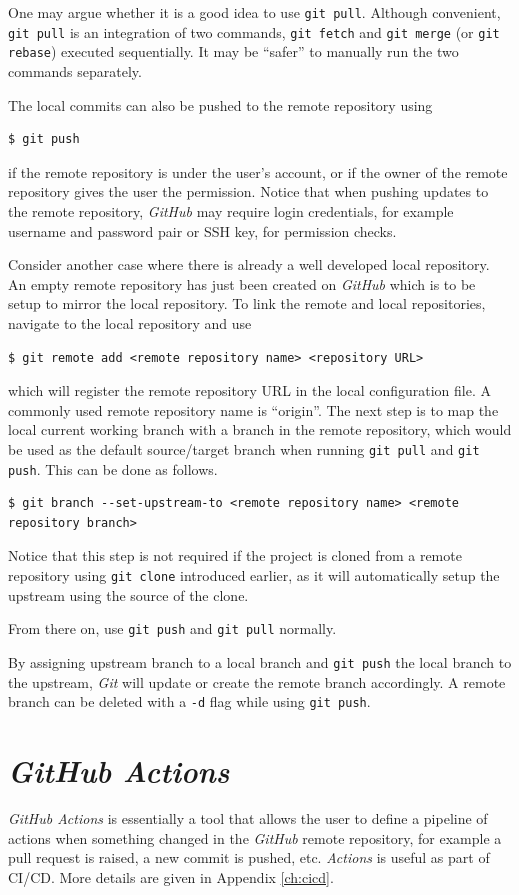 \begin{shortbox}

One may argue whether it is a good idea to use \verb|git pull|. Although convenient, \verb|git pull| is an integration of two commands, \verb|git fetch| and \verb|git merge| (or \verb|git rebase|) executed sequentially. It may be ``safer'' to manually run the two commands separately.
\end{shortbox}

The local commits can also be pushed to the remote repository using
\begin{lstlisting}
$ git push
\end{lstlisting}
if the remote repository is under the user's account, or if the owner of the remote repository gives the user the permission. Notice that when pushing updates to the remote repository, \textit{GitHub} may require login credentials, for example username and password pair or SSH key, for permission checks.

Consider another case where there is already a well developed local repository. An empty remote repository has just been created on \textit{GitHub} which is to be setup to mirror the local repository. To link the remote and local repositories, navigate to the local repository and use
\begin{lstlisting}
$ git remote add <remote repository name> <repository URL>
\end{lstlisting}
which will register the remote repository URL in the local configuration file. A commonly used remote repository name is ``origin''. The next step is to map the local current working branch with a branch in the remote repository, which would be used as the default source/target branch when running \verb|git pull| and \verb|git push|. This can be done as follows.
\begin{lstlisting}
$ git branch --set-upstream-to <remote repository name> <remote repository branch>
\end{lstlisting}
Notice that this step is not required if the project is cloned from a remote repository using \verb|git clone| introduced earlier, as it will automatically setup the upstream using the source of the clone.

From there on, use \verb|git push| and \verb|git pull| normally.

By assigning upstream branch to a local branch and \verb|git push| the local branch to the upstream, \textit{Git} will update or create the remote branch accordingly. A remote branch can be deleted with a \verb|-d| flag while using \verb|git push|.

\section{\textit{GitHub Actions}}

\textit{GitHub Actions} is essentially a tool that allows the user to define a pipeline of actions when something changed in the \textit{GitHub} remote repository, for example a pull request is raised, a new commit is pushed, etc. \textit{Actions} is useful as part of CI/CD. More details are given in Appendix \ref{ch:cicd}.
